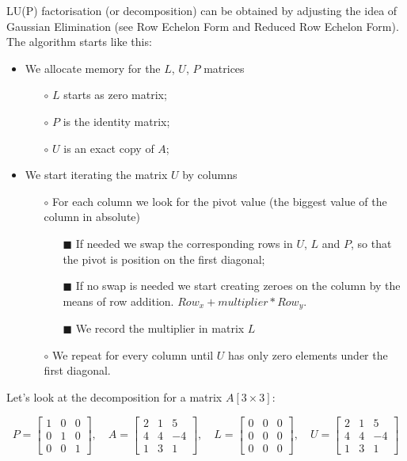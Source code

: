 LU(P) factorisation (or decomposition) can be obtained by adjusting the idea of Gaussian Elimination (see Row Echelon Form and Reduced Row Echelon Form).
\\

The algorithm starts like this:
\\

\begin{itemize}
\item We allocate memory for the $L$, $U$, $P$ matrices
	\begin{itemize} 
	\item[$\circ$] $L$ starts as zero matrix;
	\item[$\circ$] $P$ is the identity matrix;
	\item[$\circ$] $U$ is an exact copy of $A$;
	\end{itemize}
\item We start iterating the matrix $U$ by columns
	\begin{itemize} 
	\item[$\circ$] For each column we look for the pivot value (the biggest value of the column in absolute)
		\begin{itemize}
		\item[$\scriptstyle \blacksquare$] If needed we swap the corresponding rows in $U$, $L$ and $P$, so that the pivot is position on the first diagonal;
		\item[$\scriptstyle \blacksquare$] If no swap is needed we start creating zeroes on the column by the means of row addition. $Row_x + multiplier * Row_y$.
		\item[$\scriptstyle \blacksquare$] We record the multiplier in matrix $L$
		\end{itemize}
	\item[$\circ$] We repeat for every column until $U$ has only zero elements under the first diagonal.
	\end{itemize}
\end{itemize}

Let’s look at the decomposition for a matrix $A[3\times 3]$:

$$
P=
\begin{bmatrix}
1 & 0 & 0 \\
0 & 1 & 0 \\
0 & 0 & 1  
\end{bmatrix}
,\quad A =
\begin{bmatrix}
2 & 1 & 5 \\
4 & 4 & -4 \\
1 & 3 & 1  
\end{bmatrix}
,\quad L =
\begin{bmatrix}
0 & 0 & 0 \\
0 & 0 & 0 \\
0 & 0 & 0  
\end{bmatrix}
,\quad U = 
\begin{bmatrix}
2 & 1 & 5 \\
4 & 4 & -4 \\
1 & 3 & 1  
\end{bmatrix}
$$
\\

